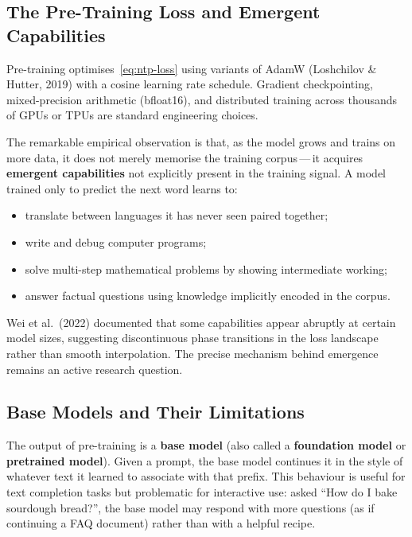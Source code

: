 \subsection{The Pre-Training Loss and Emergent Capabilities}

Pre-training optimises~\eqref{eq:ntp-loss} using variants of AdamW (Loshchilov \& Hutter, 2019) with a cosine learning rate schedule. Gradient checkpointing, mixed-precision arithmetic (bfloat16), and distributed training across thousands of GPUs or TPUs are standard engineering choices.

The remarkable empirical observation is that, as the model grows and trains on more data, it does not merely memorise the training corpus\,---\,it acquires \textbf{emergent capabilities} not explicitly present in the training signal. A model trained only to predict the next word learns to:

\begin{itemize}[leftmargin=*]
  \item translate between languages it has never seen paired together;
  \item write and debug computer programs;
  \item solve multi-step mathematical problems by showing intermediate working;
  \item answer factual questions using knowledge implicitly encoded in the corpus.
\end{itemize}

Wei et al.\ (2022) documented that some capabilities appear abruptly at certain model sizes, suggesting discontinuous phase transitions in the loss landscape rather than smooth interpolation. The precise mechanism behind emergence remains an active research question.

\subsection{Base Models and Their Limitations}

The output of pre-training is a \textbf{base model} (also called a \textbf{foundation model} or \textbf{pretrained model}). Given a prompt, the base model continues it in the style of whatever text it learned to associate with that prefix. This behaviour is useful for text completion tasks but problematic for interactive use: asked ``How do I bake sourdough bread?'', the base model may respond with more questions (as if continuing a FAQ document) rather than with a helpful recipe.

